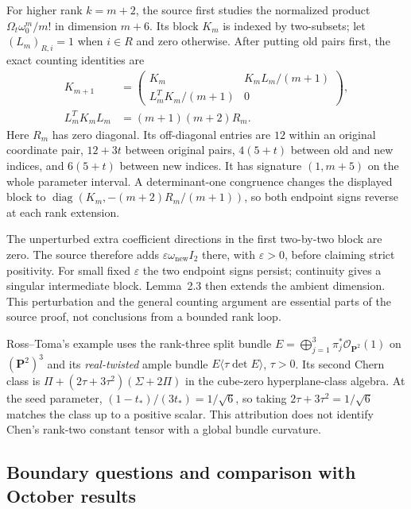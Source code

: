 For higher rank $k=m+2$, the source first studies the
normalized product $\Omega_t\omega_0^m/m!$ in dimension
$m+6$. Its block $K_m$ is indexed by two-subsets; let
$(L_m)_{R,i}=1$ when $i\in R$ and zero otherwise.
After putting old pairs first, the exact counting identities are
\begin{equation*}
 \begin{aligned}
 K_{m+1}&=\begin{pmatrix}
 K_m&K_mL_m/(m+1)\\
 L_m^TK_m/(m+1)&0
 \end{pmatrix},\\
 L_m^TK_mL_m&=(m+1)(m+2)R_m.
 \end{aligned}
 \tag{H.96}\label{eq:appH-Nakano-SD-extension-block}
\end{equation*}
Here $R_m$ has zero diagonal. Its off-diagonal entries are
$12$ within an original coordinate pair, $12+3t$ between
original pairs, $4(5+t)$ between old and new indices,
and $6(5+t)$ between new indices.
It has signature $(1,m+5)$ on the whole parameter interval.
A determinant-one congruence changes the displayed block to
$\operatorname{diag}(K_m,-(m+2)R_m/(m+1))$, so both
endpoint signs reverse at each rank extension.

The unperturbed extra coefficient directions in the first
two-by-two block are zero. The source therefore adds
$\varepsilon\omega_{\mathrm{new}}I_2$ there, with
$\varepsilon>0$, before claiming strict positivity.
For small fixed $\varepsilon$ the two endpoint signs persist;
continuity gives a singular intermediate block. Lemma~2.3
then extends the ambient dimension. This perturbation and
the general counting argument are essential parts of the
source proof, not conclusions from a bounded rank loop.

Ross--Toma's example uses the rank-three split bundle
$E=\bigoplus_{j=1}^3\pi_j^*\mathcal O_{\mathbf P^2}(1)$
on $(\mathbf P^2)^3$ and its \emph{real-twisted} ample
bundle $E\langle\tau\det E\rangle$, $\tau>0$.
Its second Chern class is
$\Pi+(2\tau+3\tau^2)(\Sigma+2\Pi)$ in the cube-zero
hyperplane-class algebra. At the seed parameter,
$(1-t_*)/(3t_*)=1/\sqrt6$, so taking
$2\tau+3\tau^2=1/\sqrt6$ matches the class up to a
positive scalar. This attribution does not identify Chen's
rank-two constant tensor with a global bundle curvature.

\subsection{Boundary questions and comparison with October results}
\label{sec:appH-Nakano-boundary-questions}

